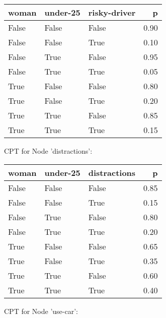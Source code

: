 \begin{tabular}{lllr}
\toprule
 woman &  under-25 &  risky-driver &    p \\
\midrule
 False &     False &         False & 0.90 \\
 False &     False &          True & 0.10 \\
 False &      True &         False & 0.95 \\
 False &      True &          True & 0.05 \\
  True &     False &         False & 0.80 \\
  True &     False &          True & 0.20 \\
  True &      True &         False & 0.85 \\
  True &      True &          True & 0.15 \\
\bottomrule
\end{tabular}


CPT for Node 'distractions':

\begin{tabular}{lllr}
\toprule
 woman &  under-25 &  distractions &    p \\
\midrule
 False &     False &         False & 0.85 \\
 False &     False &          True & 0.15 \\
 False &      True &         False & 0.80 \\
 False &      True &          True & 0.20 \\
  True &     False &         False & 0.65 \\
  True &     False &          True & 0.35 \\
  True &      True &         False & 0.60 \\
  True &      True &          True & 0.40 \\
\bottomrule
\end{tabular}


CPT for Node 'use-car':

